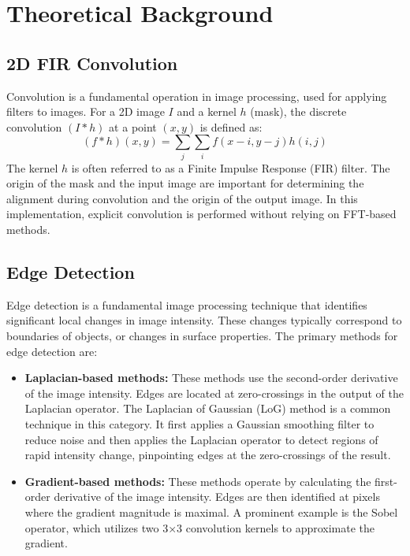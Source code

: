 \documentclass[12pt,a4paper]{article}
\begin{document}
\section{Theoretical Background}

\subsection{2D FIR Convolution}
\label{subsec:fir_convolution}
Convolution is a fundamental operation in image processing, used for applying filters to images. For a 2D image $I$ and a kernel $h$ (mask), the discrete convolution $(I * h)$ at a point $(x, y)$ is defined as:
\begin{equation}
(f * h)(x,y) = \sum_{j}\sum_{i} f(x-i, y-j)h(i,j)
\end{equation}
The kernel $h$ is often referred to as a Finite Impulse Response (FIR) filter. The origin of the mask and the input image are important for determining the alignment during convolution and the origin of the output image. In this implementation, explicit convolution is performed without relying on FFT-based methods.



\subsection{Edge Detection}\label{subsec:edge_detection}

Edge detection is a fundamental image processing technique that identifies significant local changes in image intensity. These changes typically correspond to boundaries of objects, or changes in surface properties. The primary methods for edge detection are:

\begin{itemize}
    
    \item \textbf{Laplacian-based methods:} These methods use the second-order derivative of the image intensity. Edges are located at zero-crossings in the output of the Laplacian operator. The Laplacian of Gaussian (LoG) method is a common technique in this category. It first applies a Gaussian smoothing filter to reduce noise and then applies the Laplacian operator to detect regions of rapid intensity change, pinpointing edges at the zero-crossings of the result.

    
    \item \textbf{Gradient-based methods:} These methods operate by calculating the first-order derivative of the image intensity. Edges are then identified at pixels where the gradient magnitude is maximal. A prominent example is the Sobel operator, which utilizes two 3×3 convolution kernels to approximate the gradient.
    
\end{itemize}
\end{document}
